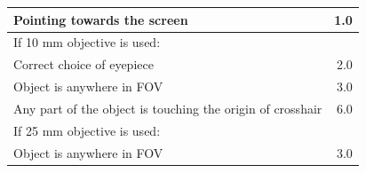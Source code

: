 \begin{center}
\begin{tabular}{l r}
\hline
Pointing towards the screen & 1.0 \\
\hline
\multicolumn{2}{l}{If 10 mm objective is used:} \\
\quad Correct choice of eyepiece & 2.0 \\
\quad Object is anywhere in FOV & 3.0 \\
\quad Any part of the object is touching the origin of crosshair & 6.0 \\
\hline
\multicolumn{2}{l}{If 25 mm objective is used:} \\
\quad Object is anywhere in FOV & 3.0 \\
\hline
\end{tabular}
\end{center}
